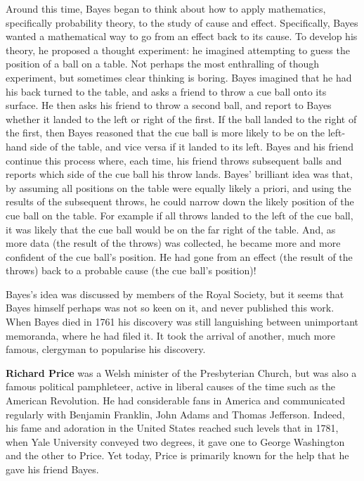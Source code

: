 \documentclass[a4paper,11pt]{apa7}
\begin{document}
Around this time, Bayes began to think about how to apply mathematics, specifically probability theory, to the study of cause and effect. Specifically, Bayes wanted a mathematical way to go from an effect back to its cause. To develop his theory, he proposed a thought experiment: he imagined attempting to guess the position of a ball on a table. Not perhaps the most enthralling of though experiment, but sometimes clear thinking is boring. Bayes imagined that he had his back turned to the table, and asks a friend to throw a cue ball onto its surface. He then asks his friend to throw a second ball, and report to Bayes whether it landed to the left or right of the first. If the ball landed to the right of the first, then Bayes reasoned that the cue ball is more likely to be on the left-hand side of the table, and vice versa if it landed to its left. Bayes and his friend continue this process where, each time, his friend throws subsequent balls and reports which side of the cue ball his throw lands. Bayes' brilliant idea was that, by assuming all positions on the table were equally likely a priori, and using the results of the subsequent throws, he could narrow down the likely position of the cue ball on the table. For example if all throws landed to the left of the cue ball, it was likely that the cue ball would be on the far right of the table. And, as more data (the result of the throws) was collected, he became more and more confident of the cue ball's position. He had gone from an effect (the result of the throws) back to a probable cause (the cue ball's position)!

Bayes's idea was discussed by members of the Royal Society, but it seems that Bayes himself perhaps was not so keen on it, and never published this work. When Bayes died in 1761 his discovery was still languishing between unimportant memoranda, where he had filed it. It took the arrival of another, much more famous, clergyman to popularise his discovery.

\textbf{Richard Price} was a Welsh minister of the Presbyterian Church, but was also a famous political pamphleteer, active in liberal causes of the time such as the American Revolution. He had considerable fans in America and communicated regularly with Benjamin Franklin, John Adams and Thomas Jefferson. Indeed, his fame and adoration in the United States reached such levels that in 1781, when Yale University conveyed two degrees, it gave one to George Washington and the other to Price. Yet today, Price is primarily known for the help that he gave his friend Bayes.
\end{document}
